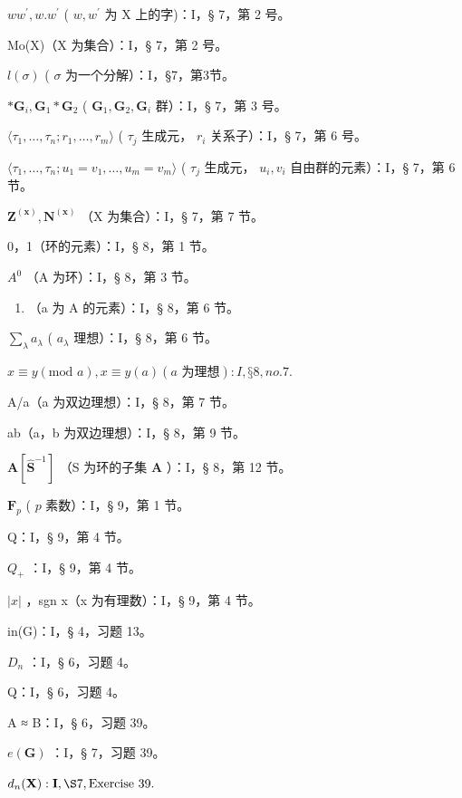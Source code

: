 \(ww^{\prime}, w.w^{\prime}\) ( \(w, w^{\prime}\) 为 X 上的字)：I，§ 7，第 2 号。

Mo(X)（X 为集合）：I，§ 7，第 2 号。

\(l(\sigma)\) ( \(\sigma\) 为一个分解）：I，§7，第3节。

\(*\mathbf{G}_i,\mathbf{G}_1*\mathbf{G}_2\) ( \(\mathbf{G}_1,\mathbf{G}_2,\mathbf{G}_i\) 群）：I，§ 7，第 3 号。

\(\langle \tau_{1},\ldots ,\tau_{n};r_{1},\ldots ,r_{m}\rangle\) ( \(\tau_{j}\) 生成元， \(r_i\) 关系子）：I，§ 7，第 6 号。

\(\langle \tau_{1},\ldots ,\tau_{n};u_{1} = v_{1},\ldots ,u_{m} = v_{m}\rangle\) ( \(\tau_{j}\) 生成元， \(u_{i},v_{i}\) 自由群的元素）：I，§ 7，第 6 节。

\(\mathbf{Z}^{(\mathbf{x})}, \mathbf{N}^{(\mathbf{x})}\) （X 为集合）：I，§ 7，第 7 节。

0，1（环的元素）：I，§ 8，第 1 节。

\(A^{0}\) （A 为环）：I，§ 8，第 3 节。

\begin{enumerate}
\def\labelenumi{(\alph{enumi})}
\tightlist
\item
  （a 为 A 的元素）：I，§ 8，第 6 节。
\end{enumerate}

\(\sum_{\lambda} a_{\lambda}\) ( \(a_{\lambda}\) 理想）：I，§ 8，第 6 节。

\(x \equiv y (\text{mod } a), x \equiv y (a) (a \text{ 为理想}): I, § 8, no. 7.\)

A/a（a 为双边理想）：I，§ 8，第 7 节。

ab（a，b 为双边理想）：I，§ 8，第 9 节。

\(\mathbf{A}[\hat{\mathbf{S}}^{-1}]\) （S 为环的子集 \(\mathbf{A}\) ）：I，§ 8，第 12 节。

\(\mathbf{F}_p\) ( \(p\) 素数）：I，§ 9，第 1 节。

Q：I，§ 9，第 4 节。

\(Q_{+}\) ：I，§ 9，第 4 节。

\(|x|\) ，sgn x（x 为有理数）：I，§ 9，第 4 节。

in(G)：I，§ 4，习题 13。

\(D_{n}\) ：I，§ 6，习题 4。

Q：I，§ 6，习题 4。

A ≈ B：I，§ 6，习题 39。

\(e(\mathbf{G})\) ：I，§ 7，习题 39。

\(d_{n}(\mathbf{X}) : \mathbf{I}, \S 7, \text{Exercise 39.}\)

